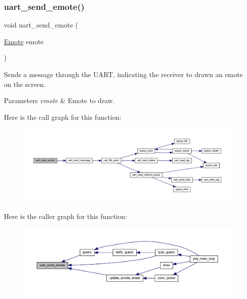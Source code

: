 \subsubsection{\texorpdfstring{uart\+\_\+send\+\_\+emote()}{uart\_send\_emote()}}
{\footnotesize\ttfamily void uart\+\_\+send\+\_\+emote (\begin{DoxyParamCaption}\item[{\mbox{\hyperlink{group__emote_ga0e527855c554e31654c9beb340145574}{Emote}}}]{emote }\end{DoxyParamCaption})}



Sends a message through the U\+A\+RT, indicating the receiver to drawn an emote on the screen. 


\begin{DoxyParams}{Parameters}
{\em emote} & Emote to draw. \\
\hline
\end{DoxyParams}
Here is the call graph for this function\+:\nopagebreak
\begin{figure}[H]
\begin{center}
\leavevmode
\includegraphics[width=350pt]{group__uart__wordgame_ga5cc4c7bd39ce863e14dde99a5f22f0e4_cgraph}
\end{center}
\end{figure}
Here is the caller graph for this function\+:\nopagebreak
\begin{figure}[H]
\begin{center}
\leavevmode
\includegraphics[width=350pt]{group__uart__wordgame_ga5cc4c7bd39ce863e14dde99a5f22f0e4_icgraph}
\end{center}
\end{figure}
\mbox{\label{group__uart__wordgame_ga2fc51e28d4b47e1ff96700527aea6ffd}} 
